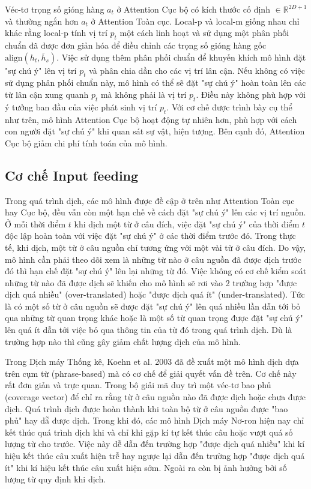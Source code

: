  Véc-tơ trọng số gióng hàng $a_t$ ở Attention Cục bộ có kích thước cố định $\in \mathbb{R}^{2D + 1}$ và thường ngắn hơn $a_t$ ở Attention Toàn cục. Local-p và local-m giống nhau chỉ khác rằng local-p tính vị trí $p_t$ một cách linh hoạt và sử dụng một phân phối chuẩn đã được đơn giản hóa để điều chỉnh các trọng số gióng hàng gốc $\text{align}(h_t, \bar{h}_s)$. Việc sử dụng thêm phân phối chuẩn để khuyến khích mô hình đặt "sự chú ý" lên vị trí $p_t$ và phân chia dần cho các vị trí lân cận. Nếu không có việc sử dụng phân phối chuẩn này, mô hình có thể sẽ đặt "sự chú ý" hoàn toàn lên các từ lân cận xung quanh $p_t$ mà không phải là vị trí $p_t$. Điều này không phù hợp với ý tưởng ban đầu của việc phát sinh vị trí $p_t$.
Với cơ chế được trình bày cụ thể như trên, mô hình Attention Cục bộ hoạt động tự nhiên hơn, phù hợp với cách con người đặt "sự chú ý" khi quan sát sự vật, hiện tượng. Bên cạnh đó, Attention Cục bộ giảm chi phí tính toán của mô hình.

\subsection{Cơ chế Input feeding}
Trong quá trình dịch, các mô hình được đề cập ở trên như Attention Toàn cục hay Cục bộ, đều vẫn còn một hạn chế về cách đặt "sự chú ý" lên các vị trí nguồn. Ở mỗi thời điểm $t$ khi dịch một từ ở câu đích, việc đặt "sự chú ý" của thời điểm $t$ độc lập hoàn toàn với việc đặt "sự chú ý" ở các thời điểm trước đó. Trong thực tế, khi dịch, một từ ở câu nguồn chỉ tương ứng với một vài từ ở câu đích. Do vậy, mô hình cần phải theo dõi xem là những từ nào ở câu nguồn đã được dịch trước đó thì hạn chế đặt "sự chú ý" lên lại những từ đó. Việc không có cơ chế kiểm soát những từ nào đã được dịch sẽ khiến cho mô hình sẽ rơi vào 2 trường hợp "được dịch quá nhiều" (over-translated) hoặc "được dịch quá ít" (under-translated). Tức là có một số từ ở câu nguồn sẽ được đặt "sự chú ý" lên quá nhiều lần dẫn tới bỏ qua những từ quan trọng khác hoặc là một số từ quan trọng được đặt "sự chú ý" lên quá ít dẫn tới việc bỏ qua thông tin của từ đó trong quá trình dịch. Dù là trường hợp nào thì cũng gây giảm chất lượng dịch của mô hình.

Trong Dịch máy Thống kê, Koehn et al. 2003 \cite{smtKoehn2003} đã đề xuất một mô hình dịch dựa trên cụm từ (phrase-based) mà có cơ chế để giải quyết vấn đề trên. Cơ chế này rất đơn giản và trực quan. Trong bộ giải mã duy trì một véc-tơ bao phủ (coverage vector) để chỉ ra rằng từ ở câu nguồn nào đã được dịch hoặc chưa được dịch. Quá trình dịch được hoàn thành khi toàn bộ từ ở câu nguồn được "bao phủ" hay dẵ được dịch. Trong khi đó, các mô hình Dịch máy Nơ-ron hiện nay chỉ kết thúc quá trình dịch khi và chỉ khi gặp kí tự kết thúc câu hoặc vượt quá số lượng từ cho trước. Việc này dễ dẫn đến trường hợp "được dịch quá nhiều" khi kí hiệu kết thúc câu xuất hiện trễ hay ngược lại dẫn đến trường hợp "được dịch quá ít" khi kí hiệu kết thúc câu xuất hiện sớm. Ngoài ra còn bị ảnh hưởng bởi số lượng từ quy định khi dịch.

